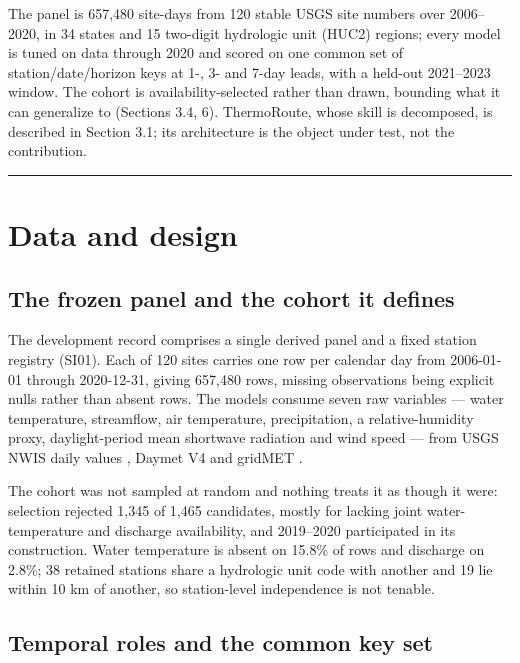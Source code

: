 The panel is 657,480 site-days from 120 stable USGS site numbers over 2006--2020,
in 34 states and 15 two-digit hydrologic unit (HUC2) regions; every model is
tuned on data through 2020 and scored on one common set of station/\allowbreak date/\allowbreak horizon
keys at 1-, 3- and 7-day leads, with a held-out 2021--2023 window. The cohort is
availability-selected rather than drawn, bounding what it can generalize to
(Sections 3.4, 6). ThermoRoute, whose skill is decomposed, is described in
Section 3.1; its architecture is the object under test, not the contribution.

\begin{center}\rule{0.5\linewidth}{0.5pt}\end{center}

\section{Data and design}\label{data-and-design}

\subsection{The frozen panel and the cohort it defines}\label{the-frozen-panel-and-the-cohort-it-defines}

The development record comprises a single derived panel and a fixed station
registry (SI01). Each of 120 sites carries one row per calendar day from
2006-01-01 through 2020-12-31, giving 657,480 rows, missing observations being
explicit nulls rather than absent rows. The models consume seven raw variables ---
water temperature, streamflow, air temperature, precipitation, a
relative-humidity proxy, daylight-period mean shortwave radiation and wind
speed --- from USGS NWIS daily values
\cite{usgs2024nwis}, Daymet V4
\cite{thornton2022daymet} and gridMET
\cite{abatzoglou2013development}.

The cohort was not sampled at random and nothing treats it as though it were:
selection rejected 1,345 of 1,465 candidates, mostly for lacking joint
water-temperature and discharge availability, and 2019--2020 participated in its
construction. Water temperature is absent on 15.8\% of rows and discharge on 2.8\%;
38 retained stations share a hydrologic unit code with another and 19 lie within
10 km of another, so station-level independence is not tenable.

\subsection{Temporal roles and the common key set}\label{temporal-roles-and-the-common-key-set}

